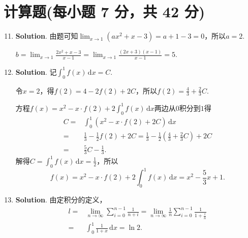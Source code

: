 \documentclass[../main.tex]{subfiles}
\begin{document}
\section{计算题(每小题 7 分，共 42 分)}
\begin{enumerate}
    \setcounter{enumi}{10}
    \item \textbf{Solution}. 由题可知$\lim_{x\to1}\left(ax^{2}+x-3\right)=a+
              1-3=0$，所以$a=2$.

          $b=\lim_{x\to1}\frac{2x^{2}+x-3}{x-1}=\lim_{x\to1}\frac{(2x+3)(x-1)}{x-1}=5$.

    \item \textbf{Solution}. 记$\int_{0}^{1}f(x)\,\mathrm{d}x=C$.

          令$x=2$，得$f(2)=4-2f(2)+2C$，所以$f(2)=\frac{4}{3}+ \frac{2}{3}C$.

          方程$f(x)=x^{2}-x\cdot f(2)+2\int_{0}^{1}f(x)\,\mathrm{d}x$两边从$0$积分到$1$得
          \[
              \begin{aligned}
                  C = {} & \int_{0}^{1}\left(x^{2}-x\cdot f(2)+2C\right)\,\mathrm{d}x                                       \\
                  = {}   & \frac{1}{3}-\frac{1}{2}f(2)+2C = \frac{1}{3}-\frac{1}{2}\left(\frac{4}{3}+\frac{2}{3}C\right)+2C \\
                  = {}   & \frac{5}{3}C-\frac{1}{3}.
              \end{aligned}
          \]
          解得$C=\int_{0}^{1}f(x)\,\mathrm{d}x=\frac{1}{2}$，所以
          \[
              f(x)=x^{2}-x\cdot f(2)+2\int_{0}^{1}f(x)\,\mathrm{d}x=x^{2}-\frac{5}{3}x+1.
          \]

    \item \textbf{Solution}. 由定积分的定义，
          \[
              \begin{aligned}
                  l = {} & \lim_{n\to\infty}\sum_{i=0}^{n-1}\frac{1}{n+i}= \lim_{n\to\infty}\frac{1}{n}\sum_{i=0}^{n-1}\frac{1}{1+\frac{i}{n}} \\
                  = {}   & \int_{0}^{1}\frac{1}{1+x}\,\mathrm{d}x = \ln 2.
              \end{aligned}
          \]


\end{enumerate}
\end{document}
